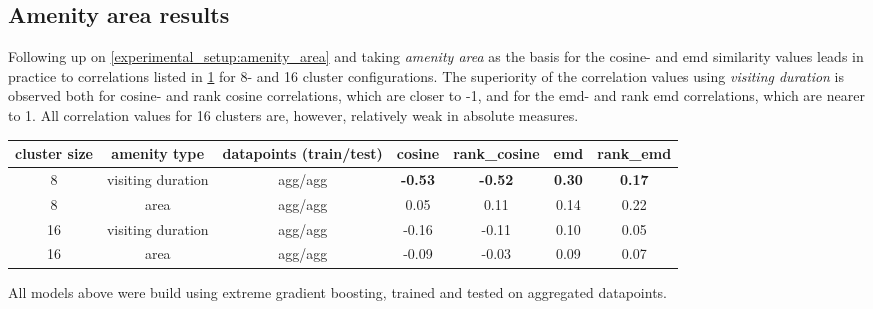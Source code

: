 \subsection{Amenity area results}
\label{evaluation:amenity_area}
Following up on \cref{experimental_setup:amenity_area} and taking \textit{amenity area} as the basis for the cosine- and emd similarity values leads in practice to correlations listed in \cref{tab:correlation_amenity_area} for 8- and 16 cluster configurations. The superiority of the correlation values using \textit{visiting duration} is observed both for cosine- and rank cosine correlations, which are closer to -1, and for the emd- and rank emd correlations, which are nearer to 1. All correlation values for 16 clusters are, however, relatively weak in absolute measures.

\begin{table}[!ht]
		{\begin{tabular}{ | c | c | c | c | c | c | c | }
			\hline
			{cluster size} 	& {amenity type} 	& datapoints (train/test) 	& cosine 	& rank\_cosine & emd & rank\_emd \\ \hline
			8 				& {visiting duration} 		& agg/agg 		& \textbf{-0.53}	& \textbf{-0.52}		&	\textbf{0.30}	&	\textbf{0.17} \\ \hline
			8 				& area 				& agg/agg 		& 0.05	&	0.11	&	0.14	&	0.22 \\ \hline \hline
			16 				& {visiting duration} 		& agg/agg 		& -0.16	&	-0.11	&	0.10	&	0.05 \\ \hline
			16 				& area 				& agg/agg 		& -0.09	&	-0.03	&	0.09	&	0.07 \\ \hline
		\end{tabular}}
		\begin{tabnote}
			All models above were build using extreme gradient boosting, trained and tested on aggregated datapoints.  
		\end{tabnote}
		\label{tab:correlation_amenity_area}
\end{table}

